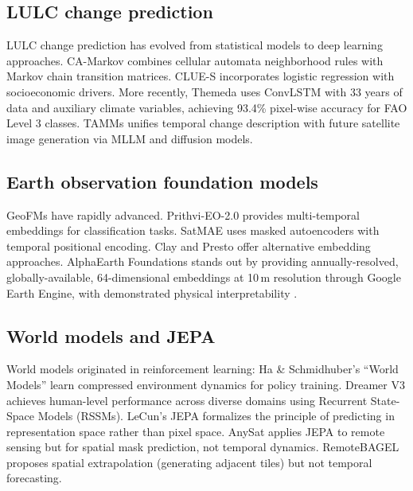 \documentclass{article}
\begin{document}
\subsection{LULC change prediction}

LULC change prediction has evolved from statistical models to deep learning approaches. CA-Markov \citep{veldkamp2004clues} combines cellular automata neighborhood rules with Markov chain transition matrices. CLUE-S \citep{verburg2002clues} incorporates logistic regression with socioeconomic drivers. More recently, Themeda \citep{turnbull2025themeda} uses ConvLSTM with 33 years of data and auxiliary climate variables, achieving 93.4\% pixel-wise accuracy for FAO Level 3 classes. TAMMs \citep{guo2025tamms} unifies temporal change description with future satellite image generation via MLLM and diffusion models.

\subsection{Earth observation foundation models}

GeoFMs have rapidly advanced. Prithvi-EO-2.0 \citep{jakubik2024prithvi} provides multi-temporal embeddings for classification tasks. SatMAE \citep{cong2022satmae} uses masked autoencoders with temporal positional encoding. Clay and Presto offer alternative embedding approaches. AlphaEarth Foundations \citep{brown2025alphaearth} stands out by providing annually-resolved, globally-available, 64-dimensional embeddings at 10\,m resolution through Google Earth Engine, with demonstrated physical interpretability \citep{rahman2026interpretable, benavides2026whatonearth}.

\subsection{World models and JEPA}

World models originated in reinforcement learning: Ha \& Schmidhuber's ``World Models'' \citep{ha2018world} learn compressed environment dynamics for policy training. Dreamer V3 \citep{hafner2023dreamerv3} achieves human-level performance across diverse domains using Recurrent State-Space Models (RSSMs). LeCun's JEPA \citep{lecun2022jepa} formalizes the principle of predicting in representation space rather than pixel space. AnySat \citep{astruc2024anysat} applies JEPA to remote sensing but for spatial mask prediction, not temporal dynamics. RemoteBAGEL \citep{remotebagel2025} proposes spatial extrapolation (generating adjacent tiles) but not temporal forecasting.
\end{document}
